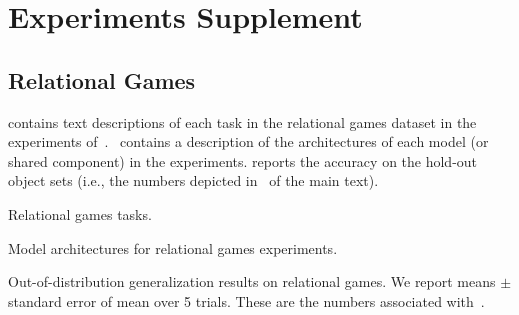 \section{Experiments Supplement}\label{sec:experiments_supplement}

\subsection{Relational Games}

 contains text descriptions of each task in the relational games dataset in the experiments of~.~ contains a description of the architectures of each model (or shared component) in the experiments.
 reports the accuracy on the hold-out object sets (i.e., the numbers depicted in~ of the main text).

\begin{table}[h]
    \centering
    
    \caption{Relational games tasks.}\label{tab:relational_games_tasks}
\end{table}

\begin{table}[h]
    \centering
    
    \caption{Model architectures for relational games experiments.}\label{tab:relgames_architectures}
\end{table}

%     

\begin{table}[h]
    \centering
    
    \caption{Out-of-distribution generalization results on relational games. We report means $\pm$ standard error of mean over 5 trials. These are the numbers associated with~.}\label{tab:ood_generalization}
\end{table}

